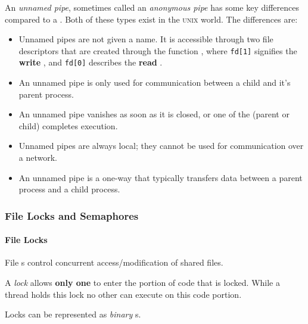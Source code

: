 \begin{definition}\label{def:Unnamed_Pipe}
  An \emph{unnamed pipe}, sometimes called an \emph{anonymous pipe} has some key differences compared to a .
  Both of these types exist in the \textsc{unix} world.
  The differences are:
  \begin{itemize}[noitemsep]
  \item Unnamed pipes are not given a name.
    It is accessible through two file descriptors that are created through the function , where \texttt{fd[1]} signifies the \textbf{write} , and \texttt{fd[0]} describes the \textbf{read} .
  \item An unnamed pipe is only used for communication between a child and it's parent process.
  \item An unnamed pipe vanishes as soon as it is closed, or one of the  (parent or child) completes execution.
  \item Unnamed pipes are always local; they cannot be used for communication over a network.
  \item An unnamed pipe is a one-way  that typically transfers data between a parent process and a child process.
  \end{itemize}
\end{definition}

\subsubsection{File Locks and Semaphores}\label{subsubsec:IPC_Mechanism-File_Locks_Semaphores}
\paragraph{File Locks}\label{par:File_Locks}
File s control concurrent access/modification of shared files.
\begin{definition}[Lock]\label{def:Lock}
  A \emph{lock} allows \textbf{only one}  to enter the portion of code that is locked.
  While a thread holds this lock no other  can execute on this code portion.

  \begin{remark}\label{rmk:Binary_Semaphore}
    Locks can be represented as \emph{binary }s.
  \end{remark}
\end{definition}

